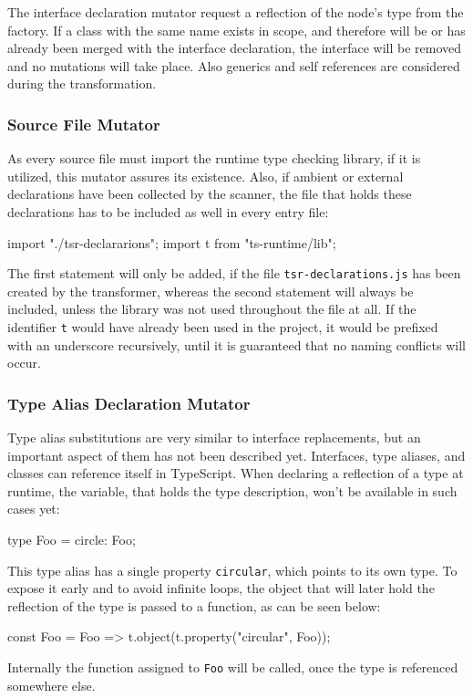 The interface declaration mutator request a reflection of the node's type from the factory. If a class with the same name exists in scope, and therefore will be or has already been merged with the interface declaration, the interface will be removed and no mutations will take place. Also generics and self references are considered during the transformation.

\subsubsection{Source File Mutator}

As every source file must import the runtime type checking library, if it is utilized, this mutator assures its existence. Also, if ambient or external declarations have been collected by the scanner, the file that holds these declarations has to be included as well in every entry file:
\begin{JsCode}[numbers=none]
import "./tsr-declararions";
import t from "ts-runtime/lib";  
\end{JsCode}
The first statement will only be added, if the file \texttt{tsr-declarations.js} has been created by the transformer, whereas the second statement will always be included, unless the library was not used throughout the file at all. If the identifier \texttt{t} would have already been used in the project, it would be prefixed with an underscore recursively, until it is guaranteed that no naming conflicts will occur. 

\subsubsection{Type Alias Declaration Mutator}

Type alias substitutions are very similar to interface replacements, but an important aspect of them has not been described yet. Interfaces, type aliases, and classes can reference itself in TypeScript. When declaring a reflection of a type at runtime, the variable, that holds the type description, won't be available in such cases yet:
\begin{JsCode}[numbers=none]
type Foo = { circle: Foo; }  
\end{JsCode}
This type alias has a single property \texttt{circular}, which points to its own type. To expose it early and to avoid infinite loops, the object that will later hold the reflection of the type is passed to a function, as can be seen below:
\begin{JsCode}[numbers=none]
const Foo = Foo => t.object(t.property("circular", Foo));
\end{JsCode}
Internally the function assigned to \texttt{Foo} will be called, once the type is referenced somewhere else.

